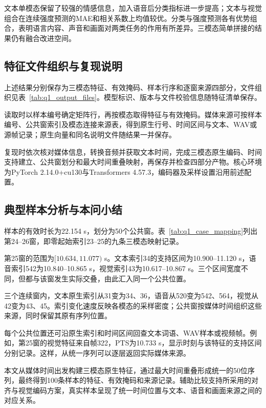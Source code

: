

\QOneParagraph 文本单模态保留了较强的情感信息，加入语音后分类指标进一步提高；文本与视觉组合在连续强度预测的MAE和相关系数上均值较优。分类与强度预测各有优势组合，表明语言内容、声音和画面对两类任务的作用有所差异。三模态简单拼接的结果仍有融合改进空间。
\FloatBarrier

\subsection{特征文件组织与复现说明}\label{subsec:q1_repro}
\QOneParagraph 上述结果分别保存为三模态特征、有效掩码、样本行序和逐窗来源四部分，文件组织见表~\ref{tab:q1_output_files}。模型标识、版本与文件校验信息随特征清单保存。



\QOneParagraph 读取时以样本编号确定矩阵行，再按模态取得特征与有效掩码。媒体来源可按样本编号、公共窗索引及模态连接来源表，得到原生行号、时间区间与文本、WAV或源帧记录；原生向量和同名说明文件随结果一并保存。

\par{}
\QOneParagraph 复现时依次核对媒体信息，转换音频并获取文本时间，完成三模态原生编码、时间支持建立、公共窗划分和最大时间重叠映射，再保存并检查四部分产物。核心环境为PyTorch 2.14.0+cu130与Transformers 4.57.3，编码器及采样设置沿用前述配置。
\FloatBarrier

\subsection{典型样本分析与本问小结}\label{subsec:q1_case_summary}
\QOneParagraph 样本\texttt{}的有效时长为22.154 s，划分为50个公共窗。表~\ref{tab:q1_case_mapping}列出第24--26窗，即零起始索引23--25的九条三模态映射记录。



\QOneParagraph 第25窗的范围为$[10.634,11.077)$ s。文本索引34的支持区间为10.900--11.120 s，语音索引542为10.840--10.865 s，视觉索引43为10.617--10.867 s。三个区间宽度不同，但都与该窗发生实际交叠，由此汇入同一个公共位置。

\QOneParagraph 三个连续窗内，文本原生索引从31变为34、36，语音从520变为542、564，视觉从42变为43、45。索引变化速度反映各模态的采样密度；公共窗按媒体时间组织这些来源，同时保留其原有序列位置。

\QOneParagraph 每个公共位置还可沿原生索引和时间区间回查文本词语、WAV样本或视频帧。例如，第25窗的视觉特征来自帧322，PTS为10.733 s，显示时刻与该特征的支持区间分别记录。这样，从统一序列可以逐层返回实际媒体来源。

\QOneParagraph 本文从媒体时间出发构建三模态原生特征，通过最大时间重叠形成统一的50位序列，最终得到100条样本的特征、有效掩码和来源记录。辅助比较支持所采用的对齐与视觉编码方案，真实样本呈现了统一时间位置与文本、语音和画面来源之间的对应关系。
\FloatBarrier
